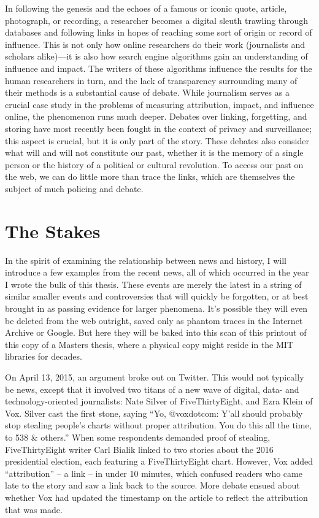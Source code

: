 In following the genesis and the echoes of a famous or iconic quote, article, photograph, or recording, a researcher becomes a digital sleuth trawling through databases and following links in hopes of reaching some sort of origin or record of influence. This is not only how online researchers do their work (journalists and scholars alike)---it is also how search engine algorithms gain an understanding of influence and impact. The writers of these algorithms influence the results for the human researchers in turn, and the lack of transparency surrounding many of their methods is a substantial cause of debate. While journalism serves as a crucial case study in the problems of measuring attribution, impact, and influence online, the phenomenon runs much deeper. Debates over linking, forgetting, and storing have most recently been fought in the context of privacy and surveillance; this aspect is crucial, but it is only part of the story. These debates also consider what will and will not constitute our past, whether it is the memory of a single person or the history of a political or cultural revolution. To access our past on the web, we can do little more than trace the links, which are themselves the subject of much policing and debate.

\section{The Stakes}

In the spirit of examining the relationship between news and history, I will introduce a few examples from the recent news, all of which occurred in the year I wrote the bulk of this thesis. These events are merely the latest in a string of similar smaller events and controversies that will quickly be forgotten, or at best brought in as passing evidence for larger phenomena. It's possible they will even be deleted from the web outright, saved only as phantom traces in the Internet Archive or Google. But here they will be baked into this scan of this printout of this copy of a Masters thesis, where a physical copy might reside in the MIT libraries for decades.

On April 13, 2015, an argument broke out on Twitter. This would not typically be news, except that it involved two titans of a new wave of digital, data- and technology-oriented journalists: Nate Silver of FiveThirtyEight, and Ezra Klein of Vox. Silver cast the first stone, saying ``Yo, @voxdotcom: Y'all should probably stop stealing people's charts without proper attribution. You do this all the time, to 538 \& others.''\autocite{silver_yo_2015} When some respondents demanded proof of stealing, FiveThirtyEight writer Carl Bialik linked to two stories about the 2016 presidential election, each featuring a FiveThirtyEight chart. However, Vox added ``attribution'' -- a link -- in under 10 minutes, which confused readers who came late to the story and saw a link back to the source. More debate ensued about whether Vox had updated the timestamp on the article to reflect the attribution that was made.

